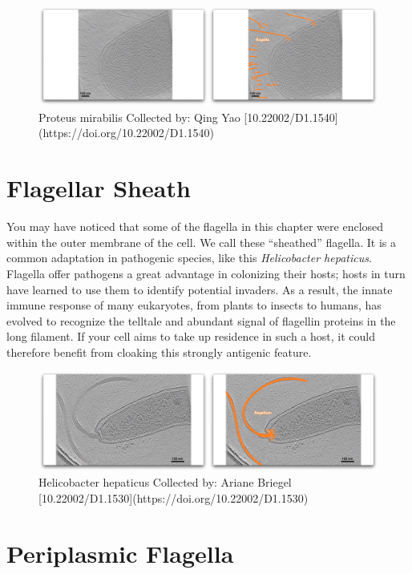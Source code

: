\documentclass[]{tufte-book}
\begin{document}
\begin{figure}
\includegraphics{movie_stills/6_5a} \caption[Proteus mirabilis Collected by]{Proteus mirabilis Collected by: Qing Yao [10.22002/D1.1540](https://doi.org/10.22002/D1.1540)}\label{fig:unnamed-chunk-109}
\end{figure}

\section{Flagellar Sheath}\label{flagellar-sheath}

You may have noticed that some of the flagella in this chapter were
enclosed within the outer membrane of the cell. We call these
``sheathed'' flagella. It is a common adaptation in pathogenic species,
like this \emph{Helicobacter hepaticus}. Flagella offer pathogens a
great advantage in colonizing their hosts; hosts in turn have learned to
use them to identify potential invaders. As a result, the innate immune
response of many eukaryotes, from plants to insects to humans, has
evolved to recognize the telltale and abundant signal of flagellin
proteins in the long filament. If your cell aims to take up residence in
such a host, it could therefore benefit from cloaking this strongly
antigenic feature.

\begin{figure}
\includegraphics{movie_stills/6_6} \caption[Helicobacter hepaticus Collected by]{Helicobacter hepaticus Collected by: Ariane Briegel [10.22002/D1.1530](https://doi.org/10.22002/D1.1530)}\label{fig:unnamed-chunk-110}
\end{figure}

\section{Periplasmic Flagella}\label{periplasmic-flagella}
\end{document}
